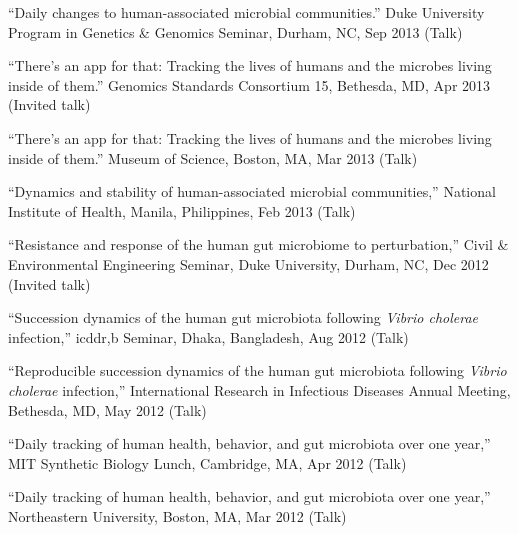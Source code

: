 \documentclass[overlapped,line,11pt]{res}
\begin{document}
\begin{resume}
\begin{revnumerate}[43]
\item {``Daily changes to human-associated microbial communities.''
  Duke University Program in Genetics \& Genomics Seminar,
  Durham, NC, Sep 2013 (Talk)}
\vspace*{0mm}

\item {``There's an app for that: Tracking the lives of humans and the
  microbes living inside of them.'' Genomics Standards Consortium 15,
  Bethesda, MD, Apr 2013 (Invited talk)}
\vspace*{0mm}

\item {``There's an app for that: Tracking the lives of humans and
  the microbes living inside of them.'' Museum of Science, Boston,
  MA, Mar 2013 (Talk)}
\vspace*{0mm}

\item {``Dynamics and stability of human-associated microbial
  communities,'' National Institute of Health, Manila,
  Philippines, Feb 2013 (Talk)}
\vspace*{0mm}

\item {``Resistance and response of the human gut microbiome to
  perturbation,'' Civil \& Environmental Engineering Seminar, Duke University,
  Durham, NC, Dec 2012 (Invited talk)}\vspace*{0mm}

\item {``Succession dynamics of the human gut microbiota
  following \emph{Vibrio cholerae} infection,'' icddr,b Seminar, Dhaka,
  Bangladesh, Aug 2012 (Talk)}
\vspace*{0mm}

\item {``Reproducible succession dynamics of the human gut microbiota
  following \emph{Vibrio cholerae} infection,'' International Research in
  Infectious Diseases Annual Meeting, Bethesda, MD, May 2012 (Talk)}
\vspace*{0mm}

\item {``Daily tracking of human health, behavior, and gut microbiota
  over one year,'' MIT Synthetic Biology Lunch, Cambridge, MA, Apr 2012 (Talk)}
\vspace*{0mm}

\item {``Daily tracking of human health, behavior, and gut microbiota
  over one year,'' Northeastern University, Boston, MA, Mar 2012 (Talk)}
\vspace*{0mm}


\end{revnumerate}
\end{resume}
\end{document}
